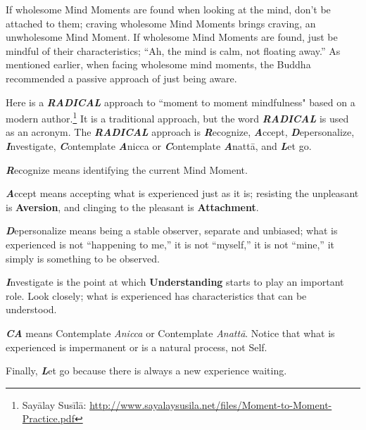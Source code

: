 If wholesome Mind Moments are found when looking at the mind, don’t be attached to them; craving wholesome Mind Moments brings craving, an unwholesome Mind Moment. If wholesome Mind Moments are found, just be mindful of their characteristics; “Ah, the mind is calm, not floating away.” As mentioned earlier, when facing wholesome mind moments, the Buddha recommended a passive approach of just being aware.

Here is a \textbf{\textit{RADICAL}} approach to ``moment to moment mindfulness" based on a modern author.\footnote{Sayālay Susīlā: \url{http://www.sayalaysusila.net/files/Moment-to-Moment-Practice.pdf}} It is a traditional approach, but the word \textbf{\textit{RADICAL}} is used as an acronym. The \textbf{\textit{RADICAL}} approach is \textbf{\textit{R}}ecognize, \textbf{\textit{A}}ccept, \textbf{\textit{D}}epersonalize, \textbf{\textit{I}}nvestigate, \textbf{\textit{C}}ontemplate \textbf{\textit{A}}nicca or \textbf{\textit{C}}ontemplate \textbf{\textit{A}}nattā, and \textbf{\textit{L}}et go.

\pagebreak

\textbf{\textit{R}}ecognize means identifying the current Mind Moment.

\textbf{\textit{A}}ccept means accepting what is experienced just as it is; resisting the unpleasant is \textbf{Aversion}, and clinging to the pleasant is \textbf{Attachment}. 

\textbf{\textit{D}}epersonalize means being a stable observer, separate and unbiased; what is experienced is not “happening to me,” it is not “myself,” it is not “mine,” it simply is something to be observed. 

\textbf{\textit{I}}nvestigate is the point at which \textbf{Understanding} starts to play an important role. Look closely; what is experienced has characteristics that can be understood. 

\textbf{\textit{CA}} means Contemplate \textit{Anicca} or Contemplate \textit{Anattā}. Notice that what is experienced is impermanent or is a natural process, not Self. 

Finally, \textbf{\textit{L}}et go because there is always a new experience waiting.


